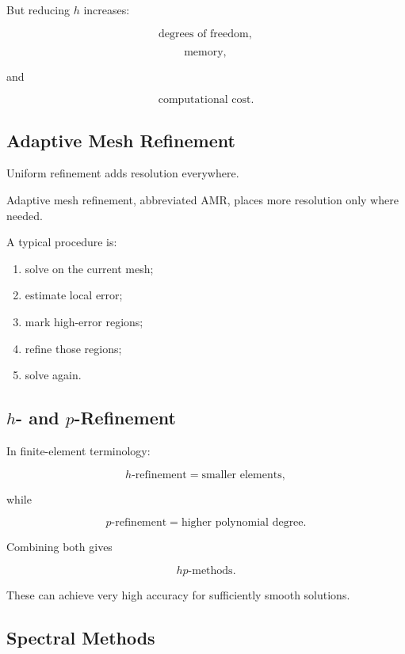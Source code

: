 But reducing \(h\) increases:

\[
\boxed{
\text{degrees of freedom},
}
\]

\[
\boxed{
\text{memory},
}
\]

and

\[
\boxed{
\text{computational cost}.
}
\]

\subsection{Adaptive Mesh Refinement}
\label{subsec:adaptive-mesh-refinement}

Uniform refinement adds resolution everywhere.

Adaptive mesh refinement, abbreviated AMR, places more resolution only
where needed.

A typical procedure is:

\begin{enumerate}
    \item solve on the current mesh;
    \item estimate local error;
    \item mark high-error regions;
    \item refine those regions;
    \item solve again.
\end{enumerate}

\subsection{\(h\)- and \(p\)-Refinement}
\label{subsec:h-p-refinement}

In finite-element terminology:

\[
\boxed{
h\text{-refinement}
=
\text{smaller elements},
}
\]

while

\[
\boxed{
p\text{-refinement}
=
\text{higher polynomial degree}.
}
\]

Combining both gives

\[
\boxed{
hp\text{-methods}.
}
\]

These can achieve very high accuracy for sufficiently smooth solutions.

\subsection{Spectral Methods}
\label{subsec:spectral-methods}

